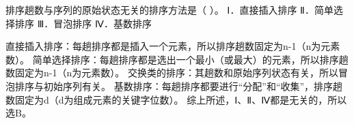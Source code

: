 \question 排序趟数与序列的原始状态无关的排序方法是（ ）。 Ⅰ．直接插入排序
Ⅱ．简单选择排序 Ⅲ．冒泡排序 Ⅳ．基数排序
\par{}
\begin{solution}直接插入排序：每趟排序都是插入一个元素，所以排序趟数固定为n-1（n为元素数）。
简单选择排序：每趟排序都是选出一个最小（或最大）的元素，所以排序趟数固定为n-1（n为元素数）。
交换类的排序：其趟数和原始序列状态有关，所以冒泡排序与初始序列有关。
基数排序：每趟排序都要进行``分配''和``收集''，排序趟数固定为d（d为组成元素的关键字位数）。
综上所述，Ⅰ、Ⅱ、Ⅳ都是无关的，所以选B。
\end{solution}
